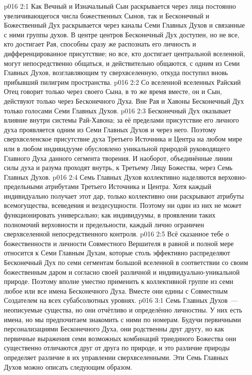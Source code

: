 \vs p016 2:1 Как Вечный и Изначальный Сын раскрывается через лица постоянно увеличивающегося числа божественных Сынов, так и Бесконечный и Божественный Дух раскрывается через каналы Семи Главных Духов и связанные с ними группы духов. В центре центров Бесконечный Дух доступен, но не все, кто достигает Рая, способны сразу же распознать его личность и дифференцированное присутствие; но все, кто достигает центральной вселенной, могут непосредственно общаться, и действительно общаются, с одним из Семи Главных Духов, возглавляющим ту сверхвселенную, откуда поступил вновь прибывший пилигрим пространства.
\vs p016 2:2 Со вселенной вселенных Райский Отец говорит только через своего Сына, в то же время вместе, он и Сын, действуют только через Бесконечного Духа. Вне Рая и Хавоны Бесконечный Дух  только голосами Семи Главных Духов.
\vs p016 2:3 \pc Бесконечный Дух оказывает влияние  внутри системы Рай\hyp{}Хавона; за её пределами присутствие его личного духа проявляется одним из Семи Главных Духов и через него. Поэтому сверхвселенское присутствие духа Третьего Источника и Центра на любом мире или в любом индивидууме обусловлено уникальной природой руководящего Главного Духа данного сегмента творения. И наоборот, объединённые линии силы духа и разума проходят внутрь, к Третьему Лицу Божества, через Семь Главных Духов.
\vs p016 2:4 \pc Семь Главных Духов коллективно наделяются верховно\hyp{}предельными атрибутами Третьего Источника и Центра. Хотя каждый индивидуально получает этот дар, только коллективно они раскрывают атрибуты всемогущества, всеведения и вездесущности. Поэтому ни один из них не может функционировать универсально; как индивидуумы, в проявлении таких полномочий верховности и предельности, каждый лично ограничен сверхвселенной непосредственного контроля.
\vs p016 2:5 Всё сказанное тебе о божественности и личности Совместного Вершителя в равной и полной мере относится к Семи Главным Духам, которые столь эффективно распределяют Бесконечный Дух по семи сегментам большой вселенной в соответствии со своим божественным даром и согласно своей различной и индивидуально\hyp{}уникальной природе. Поэтому вполне уместно применить к коллективной группе из семи любое или все имена Бесконечного Духа. Вместе они едины с Совместным Создателем на всех субабсолютных уровнях.
\vs p016 3:1 Семь Главных Духов~--- неописуемые существа, но они отчётливо и определённо личностны. У них есть имена, но мы предпочитаем знакомить с ними по номерам. Будучи первичными персонализациями Бесконечного Духа, они родственны друг другу, но как первичные выражения семи возможных комбинаций триединого Божества они существенно отличаются друг от друга по природе, и это различие природы определяет различие в их управлении сверхвселенными. Эти Семь Главных Духов можно описать следующим образом.
